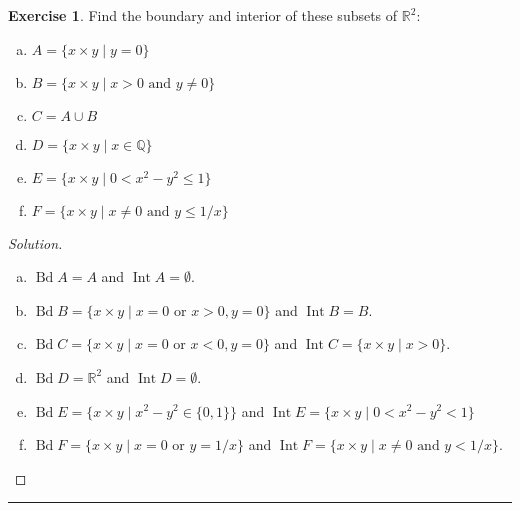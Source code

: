 \documentclass{article}
\theoremstyle{definition}
\newtheorem{exercise}{Exercise}[section]
\DeclareMathOperator{\Bd}{\mathrm{Bd}}
\DeclareMathOperator{\Int}{\mathrm{Int}}
\begin{document}
\begin{exercise}
  Find the boundary and interior of these subsets of $\mathbb{R}^2$:
  \begin{enumerate}[(a)]
    \item $A = \{x\times y\mid y = 0\}$
    \item $B = \{x\times y\mid x > 0\text{ and } y\ne 0\}$
    \item $C = A\cup B$
    \item $D = \{x\times y\mid x\in\mathbb{Q}\}$
    \item $E = \{x\times y\mid 0 < x^2-y^2 \le 1\}$
    \item $F = \{x\times y\mid x\ne 0\text{ and } y \le 1/x\}$
  \end{enumerate}
\end{exercise}
\begin{proof}[Solution]
  \begin{enumerate}[(a)]
    \item $\Bd A = A$ and $\Int A = \emptyset$.
    \item $\Bd B = \{x\times y\mid x = 0\text{ or } x>0,y=0\}$ and $\Int B = B$.
    \item $\Bd C = \{x\times y\mid x = 0\text{ or } x<0,y=0\}$ and $\Int C = \{x\times y\mid x > 0\}$.
    \item $\Bd D = \mathbb{R}^2$ and $\Int D = \emptyset$.
    \item $\Bd E = \{x\times y\mid x^2-y^2\in\{0,1\}\}$ and $\Int E = \{x\times y\mid 0 < x^2-y^2 < 1\}$
    \item $\Bd F = \{x\times y\mid x = 0\text{ or } y = 1/x\}$ and $\Int F = \{x\times y\mid x\ne 0\text{ and } y < 1/x\}$.
  \end{enumerate}
\end{proof}

\hrule
\end{document}
